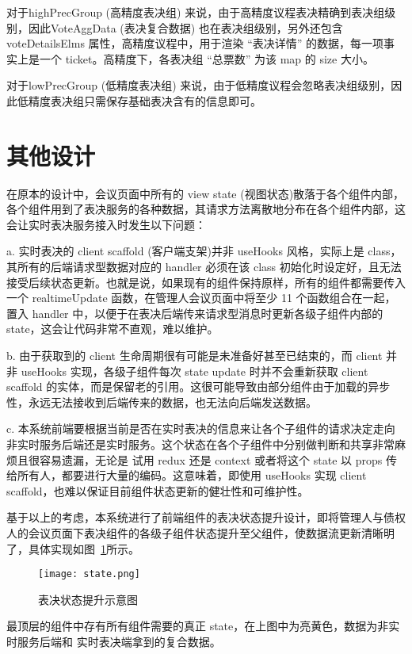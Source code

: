   对于highPrecGroup (高精度表决组) 来说，由于高精度议程表决精确到表决组级别，因此VoteAggData (表决复合数据) 也在表决组级别，另外还包含 voteDetailsElms 属性，高精度议程中，用于渲染 “表决详情” 的数据，每一项事实上是一个 ticket。高精度下，各表决组 “总票数” 为该 map 的 size 大小。

  对于lowPrecGroup (低精度表决组) 来说，由于低精度议程会忽略表决组级别，因此低精度表决组只需保存基础表决含有的信息即可。

  \section{其他设计}
  在原本的设计中，会议页面中所有的 view state (视图状态)散落于各个组件内部，各个组件用到了表决服务的各种数据，其请求方法离散地分布在各个组件内部，这会让实时表决服务接入时发生以下问题：

  \quad{}a. 实时表决的 client scaffold (客户端支架)并非 useHooks 风格，实际上是 class，其所有的后端请求型数据对应的 handler 必须在该 class 初始化时设定好，且无法接受后续状态更新。也就是说，如果现有的组件保持原样，所有的组件都需要传入一个 realtimeUpdate 函数，在管理人会议页面中将至少 11 个函数组合在一起，置入 handler 中，以便于在表决后端传来请求型消息时更新各级子组件内部的 state，这会让代码非常不直观，难以维护。

  \quad{}b. 由于获取到的 client 生命周期很有可能是未准备好甚至已结束的，而 client 并非 useHooks 实现，各级子组件每次 state update 时并不会重新获取 client scaffold 的实体，而是保留老的引用。这很可能导致由部分组件由于加载的异步性，永远无法接收到后端传来的数据，也无法向后端发送数据。

  \quad{}c. 本系统前端要根据当前是否在实时表决的信息来让各个子组件的请求决定走向非实时服务后端还是实时服务。这个状态在各个子组件中分别做判断和共享非常麻烦且很容易遗漏，无论是 试用 redux 还是 context 或者将这个 state 以 props 传给所有人，都要进行大量的编码。这意味着，即使用 useHooks 实现 client scaffold，也难以保证目前组件状态更新的健壮性和可维护性。

  基于以上的考虑，本系统进行了前端组件的表决状态提升设计，即将管理人与债权人的会议页面下表决组件的各级子组件状态提升至父组件，使数据流更新清晰明了，具体实现如图~\ref{fig:state}所示。

  \begin{figure}[!htp]
    \centering
    \texttt{[image: state.png]}
    \caption{表决状态提升示意图}
   \label{fig:state}
  \end{figure}

  最顶层的组件中存有所有组件需要的真正 state，在上图中为亮黄色，数据为非实时服务后端和 实时表决端拿到的复合数据。

